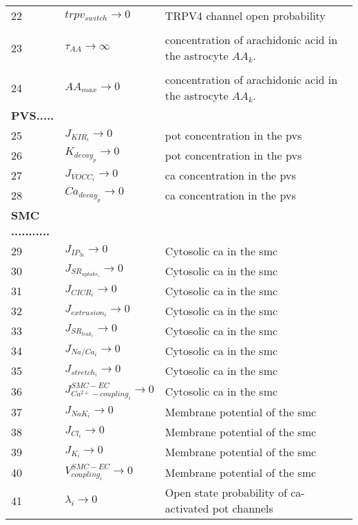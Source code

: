\documentclass[]{article}
\newcommand{\pot}{\gls{pot}\xspace}
\newcommand{\ca}{\gls{ca}\xspace}
\begin{document}
\begin{longtable}[h!] { p{0.12\linewidth}  p{0.28\linewidth}     p{0.6\linewidth} }
22	& 	   $trpv_{switch}\rightarrow 0$ & TRPV4 channel open probability   \\
	& 	    & \\
23	& 	   $\tau_{AA}\rightarrow \infty$ & concentration of arachidonic acid in the astrocyte $AA_k$.\\
	& 	    & \\ 
24	& 	   $AA_{max}\rightarrow 0$ & concentration of arachidonic acid in the astrocyte $AA_k$. \\
 \textbf{PVS.....}& & \\
25 &    $J_{KIR_i}\rightarrow 0$ & \pot concentration in the \gls{pvs}\\
26 &    $K_{decay_p} \rightarrow 0$ & \pot concentration in the \gls{pvs}\\
27 &    $J_{VOCC_i} \rightarrow 0$ & \ca concentration in the \gls{pvs} \\
28 &    $Ca_{decay_p} \rightarrow 0$ &  \ca concentration in the \gls{pvs}\\
 \textbf{SMC ...........} &      &\\
29 &    $ J_{IP_{3i}} \rightarrow 0$ & Cytosolic \ca in the \gls{smc}\\
30 &    $J_{SR_{uptake_{i}}} \rightarrow 0$ & Cytosolic \ca in the \gls{smc}\\
31 &    $ J_{CICR_{i}}\rightarrow 0$ & Cytosolic \ca in the \gls{smc} \\
32 &    $J_{extrusion_{i}} \rightarrow 0$ &Cytosolic \ca in the \gls{smc} \\
33 &    $  J_{SR_{leak_{i}}}\rightarrow 0$ & Cytosolic \ca in the \gls{smc}\\
34 &    $ J_{Na/Ca_{i}} \rightarrow 0$ & Cytosolic \ca in the \gls{smc}\\
35 &    $J_{stretch_{i}} \rightarrow 0$ & Cytosolic \ca in the \gls{smc}\\
36 &    $J_{Ca^{2+}-coupling_{i}}^{SMC-EC} \rightarrow 0$ &Cytosolic \ca in the \gls{smc} \\
37 &    $J_{NaK_{i}}\rightarrow 0$ & Membrane potential of the \gls{smc}\\
38 &    $J_{Cl_{i}}  \rightarrow 0$ & Membrane potential of the \gls{smc}\\
39 &    $ J_{K_{i}}\rightarrow 0$ & Membrane potential of the \gls{smc} \\
40 &    $V^{SMC-EC}_{coupling_{i}} \rightarrow 0$ &  Membrane potential of the \gls{smc}\\
41 &    $\lambda_{i}   \rightarrow 0$ &  Open state probability of \ca-activated \pot channels \\

\end{longtable}
\end{document}
